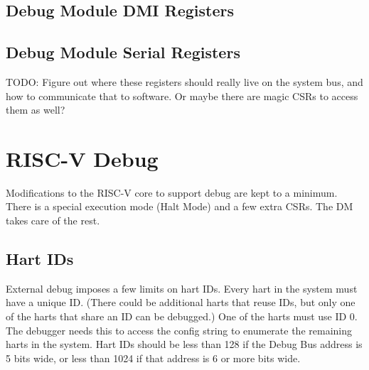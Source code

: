 \documentclass{article}
\begin{document}
\subsection{Debug Module DMI Registers} \label{dmdebbus}



\subsection{Debug Module Serial Registers} \label{dmsysbus}

TODO: Figure out where these registers should really live on the system bus,
and how to communicate that to software. Or maybe there are magic CSRs to
access them as well?



%
%

\section{RISC-V Debug}

Modifications to the RISC-V core to support debug are kept to a minimum.  There
is a special execution mode (Halt Mode) and a few extra CSRs. The DM takes care
of the rest.

\subsection{Hart IDs}

External debug imposes a few limits on hart IDs. Every hart in the system must
have a unique ID. (There could be additional harts that reuse IDs, but only one
of the harts that share an ID can be debugged.) One of the harts must use ID 0.
The debugger needs this to access the config string to enumerate the remaining
harts in the system. Hart IDs should be less than 128 if the Debug Bus address
is 5 bits wide, or less than 1024 if that address is 6 or more bits wide.
\end{document}
